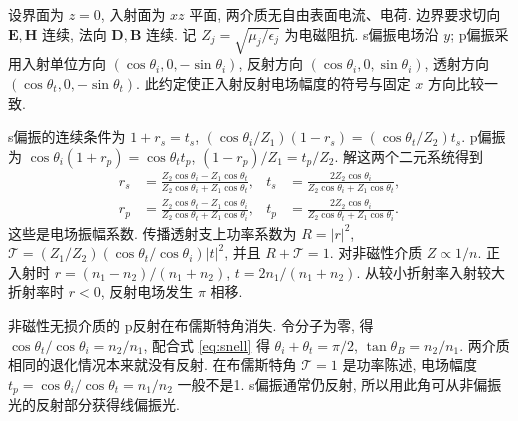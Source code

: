 设界面为 $z=0$, 入射面为 $xz$ 平面, 两介质无自由表面电流、电荷. 边界要求切向 $\boldsymbol E,\boldsymbol H$ 连续, 法向 $\boldsymbol D,\boldsymbol B$ 连续. 记 $Z_j=\sqrt{\mu_j/\epsilon_j}$ 为电磁阻抗. s偏振电场沿 $y$; p偏振采用入射单位方向 $(\cos\theta_i,0,-\sin\theta_i)$, 反射方向 $(\cos\theta_i,0,\sin\theta_i)$, 透射方向 $(\cos\theta_t,0,-\sin\theta_t)$. 此约定使正入射反射电场幅度的符号与固定 $x$ 方向比较一致.

s偏振的连续条件为 $1+r_s=t_s$, $(\cos\theta_i/Z_1)(1-r_s)=(\cos\theta_t/Z_2)t_s$. p偏振为 $\cos\theta_i(1+r_p)=\cos\theta_t t_p$, $(1-r_p)/Z_1=t_p/Z_2$. 解这两个二元系统得到
\begin{align*}
r_s&=\frac{Z_2\cos\theta_i-Z_1\cos\theta_t}{Z_2\cos\theta_i+Z_1\cos\theta_t},&
t_s&=\frac{2Z_2\cos\theta_i}{Z_2\cos\theta_i+Z_1\cos\theta_t},\\
r_p&=\frac{Z_2\cos\theta_t-Z_1\cos\theta_i}{Z_2\cos\theta_t+Z_1\cos\theta_i},&
t_p&=\frac{2Z_2\cos\theta_i}{Z_2\cos\theta_t+Z_1\cos\theta_i}.
\end{align*}
这些是电场振幅系数. 传播透射支上功率系数为 $R=|r|^2$, $\mathcal T=(Z_1/Z_2)(\cos\theta_t/\cos\theta_i)|t|^2$, 并且 $R+\mathcal T=1$. 对非磁性介质 $Z\propto1/n$. 正入射时 $r=(n_1-n_2)/(n_1+n_2)$, $t=2n_1/(n_1+n_2)$. 从较小折射率入射较大折射率时 $r<0$, 反射电场发生 $\pi$ 相移.

非磁性无损介质的 p反射在布儒斯特角消失. 令分子为零, 得 $\cos\theta_t/\cos\theta_i=n_2/n_1$, 配合式 \eqref{eq:snell} 得 $\theta_i+\theta_t=\pi/2$, $\tan\theta_B=n_2/n_1$. 两介质相同的退化情况本来就没有反射. 在布儒斯特角 $\mathcal T=1$ 是功率陈述, 电场幅度 $t_p=\cos\theta_i/\cos\theta_t=n_1/n_2$ 一般不是1. s偏振通常仍反射, 所以用此角可从非偏振光的反射部分获得线偏振光.
